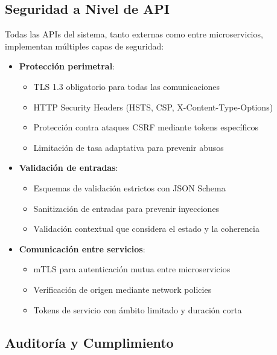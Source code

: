 \documentclass[12pt,a4paper]{article}
\begin{document}
\subsection{Seguridad a Nivel de API}
\label{subsec:as-api-security}

Todas las APIs del sistema, tanto externas como entre microservicios, implementan múltiples capas de seguridad:

\begin{itemize}
    \item \textbf{Protección perimetral}:
    \begin{itemize}
        \item TLS 1.3 obligatorio para todas las comunicaciones
        \item HTTP Security Headers (HSTS, CSP, X-Content-Type-Options)
        \item Protección contra ataques CSRF mediante tokens específicos
        \item Limitación de tasa adaptativa para prevenir abusos
    \end{itemize}
    
    \item \textbf{Validación de entradas}:
    \begin{itemize}
        \item Esquemas de validación estrictos con JSON Schema
        \item Sanitización de entradas para prevenir inyecciones
        \item Validación contextual que considera el estado y la coherencia
    \end{itemize}
    
    \item \textbf{Comunicación entre servicios}:
    \begin{itemize}
        \item mTLS para autenticación mutua entre microservicios
        \item Verificación de origen mediante network policies
        \item Tokens de servicio con ámbito limitado y duración corta
    \end{itemize}
\end{itemize}

\subsection{Auditoría y Cumplimiento}
\label{subsec:as-auditoria}
\end{document}

